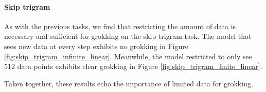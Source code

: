 \documentclass{article} %
\begin{document}
\paragraph{Skip trigram} As with the previous tasks, we find that restricting the amount of data is necessary and sufficient for grokking on the skip trigram task. The model that sees new data at every step exhibits no grokking in Figure \ref{fig:skip_trigram_infinite_linear}. Meanwhile, the model restricted to only see 512 data points exhibits clear grokking in Figure \ref{fig:skip_trigram_finite_linear}. 



Taken together, these results echo the importance of limited data for grokking. 
\end{document}
